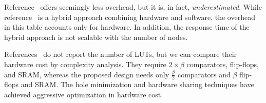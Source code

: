 Reference~\cite{hw11} offers seemingly less overhead, but it is, in fact, {\it underestimated}.
While reference~\cite{hw11} is a hybrid approach combining hardware and software, the overhead in this table accounts only for hardware.
In addition, the response time of the hybrid approach is not scalable with the number of nodes.

References~\cite{fpga1,hw2} do not report the number of LUTs, but we can compare their hardware cost by complexity analysis.
They require $2 \times \beta$ comparators, flip-flops, and SRAM, whereas the proposed design needs only $\frac{\beta}{2}$ comparators and $\beta$ flip-flops and SRAM.
The hole minimization and hardware sharing techniques have achieved aggressive optimization in hardware cost.
